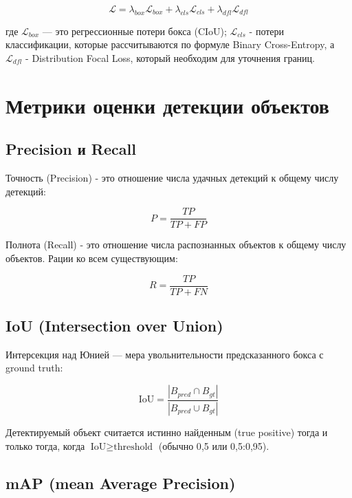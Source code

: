 \begin{equation}
\mathcal{L} = \lambda_{box} \mathcal{L}_{box} + \lambda_{cls} \mathcal{L}_{cls} + \lambda_{dfl} \mathcal{L}_{dfl}
\label{eq:yolov8loss}
\end{equation}

где $\mathcal{L}_{box}$ --- это регрессионные потери бокса (CIoU); $\mathcal{L}_{cls}$ - потери классификации, которые рассчитываются по формуле Binary Cross-Entropy, а $\mathcal{L}_{dfl}$ - Distribution Focal Loss, который необходим для уточнения границ. \section{Метрики оценки детекции объектов}

\subsection{Precision и Recall}

Точность (Precision) - это отношение числа удачных детекций к общему числу детекций:

\begin{equation}
P = \frac{TP}{TP + FP}
\label{eq:precision}
\end{equation}

Полнота (Recall) - это отношение числа распознанных объектов к общему числу объектов. Рации ко всем существующим:

\begin{equation}
R = \frac{TP}{TP + FN}
\label{eq:recall}
\end{equation}

\subsection{IoU (Intersection over Union)}

Интерсекция над Юнией --- мера увольнительности предсказанного бокса с ground truth:

\begin{equation}
\text{IoU} = \frac{|B_{pred} \cap B_{gt}|}{|B_{pred} \cup B_{gt}|}
\label{eq:iou}
\end{equation}

Детектируемый объект считается истинно найденным (true positive) тогда и только тогда, когда $\text{IoU} \geq \text{threshold}$ (обычно 0{,}5 или 0{,}5:0{,}95).

\subsection{mAP (mean Average Precision)}

